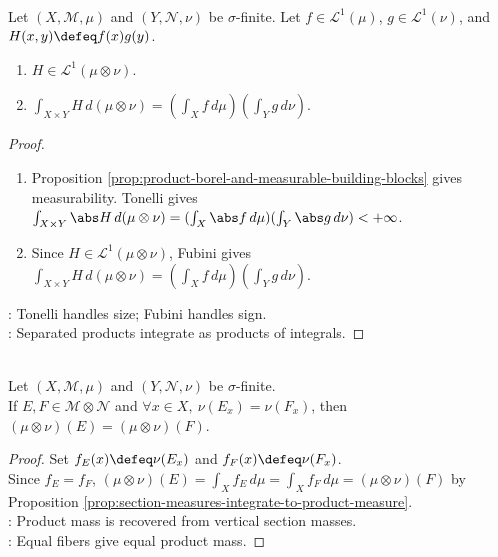 \begin{proposition} \label{prop:integrable-separated-products} \\
Let $(X,\mathcal{M},\mu)$ and $(Y,\mathcal{N},\nu)$ be $\sigma$-finite. Let $f\in\mathscr{L}^1(\mu)$, $g\in\mathscr{L}^1(\nu)$, and $H(x,y)\defeq f(x)g(y)$.
\begin{enumerate}[label=(\roman*)]
\setlength{\itemsep}{0pt}
\item $H\in\mathscr{L}^1(\mu\otimes\nu)$.
\item $\int_{X\times Y}H\,d(\mu\otimes\nu)=(\int_Xf\,d\mu)(\int_Yg\,d\nu)$.
\end{enumerate}
\begin{proof}
\begin{enumerate}[label=(\roman*)]
\setlength{\itemsep}{0pt}
\item Proposition \ref{prop:product-borel-and-measurable-building-blocks} gives measurability. Tonelli gives $\int_{X\times Y}\abs H\,d(\mu\otimes\nu)=(\int_X\abs f\,d\mu)(\int_Y\abs g\,d\nu)<+\infty$.
\item Since $H\in\mathscr{L}^1(\mu\otimes\nu)$, Fubini gives $\int_{X\times Y}H\,d(\mu\otimes\nu)=(\int_Xf\,d\mu)(\int_Yg\,d\nu)$.
\end{enumerate}
: Tonelli handles size; Fubini handles sign.\\
: Separated products integrate as products of integrals.
\end{proof}
\end{proposition}

\begin{corollary} \label{cor:equal-section-measures-equal-product-measure} \\
Let $(X,\mathcal{M},\mu)$ and $(Y,\mathcal{N},\nu)$ be $\sigma$-finite.\\
If $E,F\in\mathcal{M}\otimes\mathcal{N}$ and $\forall x\in X,\ \nu(E_x)=\nu(F_x)$, then $(\mu\otimes\nu)(E)=(\mu\otimes\nu)(F)$.
\begin{proof}
Set $f_E(x)\defeq\nu(E_x)$ and $f_F(x)\defeq\nu(F_x)$.\\
Since $f_E=f_F$, $(\mu\otimes\nu)(E)=\int_Xf_E\,d\mu=\int_Xf_F\,d\mu=(\mu\otimes\nu)(F)$ by Proposition \ref{prop:section-measures-integrate-to-product-measure}.\\
: Product mass is recovered from vertical section masses.\\
: Equal fibers give equal product mass.
\end{proof}
\end{corollary}

